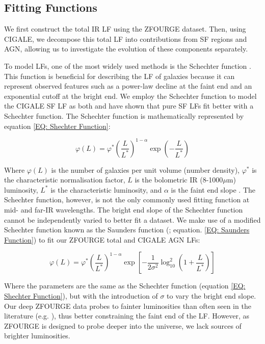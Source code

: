\subsection{Fitting Functions}

We first construct the total IR LF using the ZFOURGE dataset. Then, using CIGALE, we decompose this total LF into contributions from SF regions and AGN, allowing us to investigate the evolution of these components separately.

To model LFs, one of the most widely used methods is the Schechter function \citep{schechter_analytic_1976}. This function is beneficial for describing the LF of galaxies because it can represent observed features such as a power-law decline at the faint end and an exponential cutoff at the bright end. We employ the Schechter function to model the CIGALE SF LF as both \cite{fu_decomposing_2010} and \cite{wu_mid-infrared_2011} have shown that pure SF LFs fit better with a Schechter function. The Schechter function is mathematically represented by equation \ref{EQ: Shechter Function}:

\begin{equation} 
    \varphi(L) = \varphi^* \left(\frac{L}{L^*}\right)^{1-\alpha} \exp\left(-\frac{L}{L^*}\right) 
    \label{EQ: Shechter Function}
\end{equation}

Where $\varphi(L)$ is the number of galaxies per unit volume (number density), $\varphi^*$ is the characteristic normalisation factor, $L$ is the bolometric IR (8-1000$\mu$m) luminosity, $L^*$ is the characteristic luminosity, and $\alpha$ is the faint end slope \citep{schechter_analytic_1976}. The Schechter function, however, is not the only commonly used fitting function at mid- and far-IR wavelengths. The bright end slope of the Schechter function cannot be independently varied to better fit a dataset. We make use of a modified Schechter function known as the Saunders function (\citealp{saunders_60-mum_1990}; equation. \ref{EQ: Saunders Function}) to fit our ZFOURGE total and CIGALE AGN LFs:

\begin{equation} 
    \varphi(L) = \varphi^* \left(\frac{L}{L^*}\right)^{1-\alpha} \exp\left[-\frac{1}{2\sigma^2}\log_{10}^2\left(1+\frac{L}{L^*}\right)\right]
    \label{EQ: Saunders Function}
\end{equation}

Where the parameters are the same as the Schechter function (equation \ref{EQ: Shechter Function}), but with the introduction of $\sigma$ to vary the bright end slope. Our deep ZFOURGE data probes to fainter luminosities than often seen in the literature (e.g. \citealp{gruppioni_herschel_2013, rodighiero_mid-_2010}), thus better constraining the faint end of the LF. However, as ZFOURGE is designed to probe deeper into the universe, we lack sources of brighter luminosities. 

